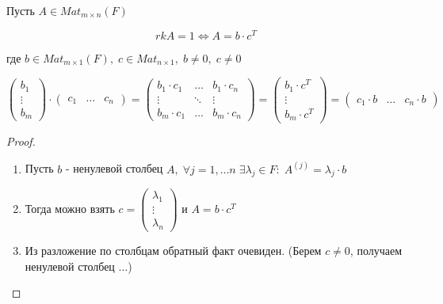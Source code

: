 \begin{lemma}
    
    Пусть $A \in Mat_{m \times n}(F)$

    $$rk A = 1 \Leftrightarrow A = b \cdot c^T$$

    где $b \in Mat_{m \times 1}(F), \; c \in Mat_{n \times 1}, \; b \not= 0, \; c \not= 0$

    $$\begin{pmatrix}
        b_1 \\ \vdots \\ b_m
    \end{pmatrix} \cdot \begin{pmatrix}
        c_1 & \dots & c_n
    \end{pmatrix} = \begin{pmatrix}
        b_1 \cdot c_1 & \dots & b_1 \cdot c_n \\
        \vdots & \ddots & \vdots \\
        b_m \cdot c_1 & \dots & b_m \cdot c_n
    \end{pmatrix} = \begin{pmatrix}
        b_1 \cdot c^T \\ \vdots \\ b_m \cdot c^T
    \end{pmatrix} = \begin{pmatrix}
        c_1 \cdot b & \dots & c_n \cdot b
    \end{pmatrix}$$

    \begin{proof}~

        \begin{enumerate}
            \item Пусть $b$ - ненулевой столбец $A, \; \forall j = 1, \dots n \; \exists \lambda_j \in F: \; A^{(j)} = \lambda_j \cdot b$
            \item Тогда можно взять $c = \begin{pmatrix}
                \lambda_1 \\ \vdots \\ \lambda_n
            \end{pmatrix}$ и $A = b \cdot c^T$
            \item Из разложение по столбцам обратный факт очевиден. (Берем $c \not= 0$, получаем ненулевой столбец $\dots$)
        \end{enumerate}
        
    \end{proof}

\end{lemma}


